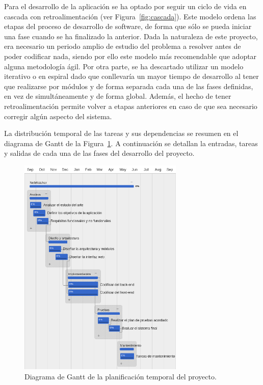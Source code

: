 Para el desarrollo de la aplicación se ha optado por seguir un ciclo de vida en cascada con retroalimentación (ver Figura~\ref{fig:cascada}).
Este modelo ordena las etapas del proceso de desarrollo de software, de forma que sólo se pueda iniciar una fase cuando se ha finalizado la anterior.
Dada la naturaleza de este proyecto, era necesario un periodo amplio de estudio del problema a resolver antes de poder codificar nada, siendo por ello este modelo más recomendable que adoptar alguna metodología ágil.
Por otra parte, se ha descartado utilizar un modelo iterativo o en espiral dado que conllevaría un mayor tiempo de desarrollo al tener que realizarse por módulos y de forma separada cada una de las fases definidas, en vez de simultáneamente y de forma global.
Además, el hecho de tener retroalimentación permite volver a etapas anteriores en caso de que sea necesario corregir algún aspecto del sistema.

La distribución temporal de las tareas y sus dependencias se resumen en el diagrama de Gantt de la Figura~\ref{fig:gantt}.
A continuación se detallan la entradas, tareas y salidas de cada una de las fases del desarrollo del proyecto.

\begin{figure}[!htp]
  \centering
  \includegraphics[width=0.7\textwidth,clip=true]{graphics/gantt_white}
  \caption{Diagrama de Gantt de la planificación temporal del proyecto.}
  \label{fig:gantt}
\end{figure}

